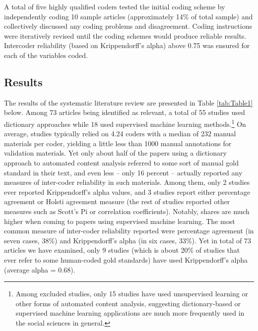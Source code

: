 \documentclass[man, 12pt, a4paper, nolmodern, noextraspace]{apa6}
\begin{document}
    A total of five highly qualified coders tested the initial coding scheme by independently coding 10 sample articles (approximately 14\% of total sample) and collectively discussed any coding problems and disagreement. Coding instructions were iteratively revised until the coding schemes would produce reliable results. Intercoder reliability (based on Krippendorff’s alpha) above 0.75 was ensured for each of the variables coded.   
    
\subsection{Results}

    The results of the systematic literature review are presented in Table \ref{tab:Table1} below. Among 73 articles being identified as relevant, a total of 55 studies used dictionary approaches while 18 used supervised machine learning methods.\footnote{ Among excluded studies, only 15 studies have used unsupervised learning or other forms of automated content analysis, suggesting dictionary-based or supervised machine learning applications are much more frequently used in the social sciences in general.\label{fn:Study1}} On average, studies typically relied on 4.24 coders with a median of 232 manual materials per coder, yielding a little less than 1000 manual annotations for validation materials. Yet only about half of the papers using a dictionary approach to automated content analysis referred to some sort of manual gold standard in their text, and even less – only 16 percent – actually reported any measures of inter-coder reliability in such materials. Among them, only 2 studies ever reported Krippendorff’s alpha values, and 3 studies report either percentage agreement or Holsti agreement measure (the rest of studies reported other measures such as Scott's Pi or correlation coefficients). Notably, shares are much higher when coming to papers using supervised machine learning. The most common measure of inter-coder reliability reported were percentage agreement (in seven cases, 38\%) and Krippendorff’s alpha (in six cases, 33\%). Yet in total of 73 articles we have examined, only 9 studies (which is about 20\% of studies that ever refer to some human-coded gold standards) have used Krippendorff’s alpha (average alpha = 0.68). 
    
\end{document}
